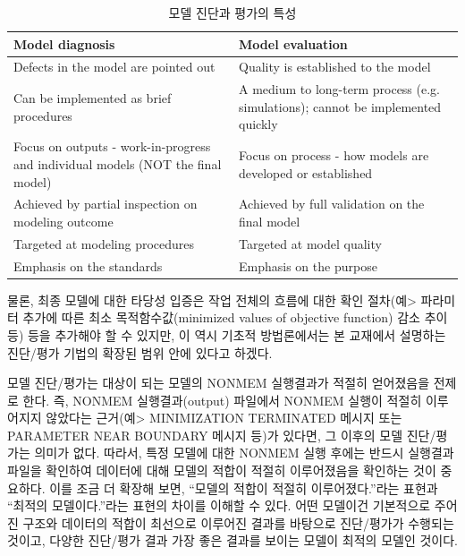 \documentclass[
  11pt,
  krantz2, a4paper, twoside]{krantz}
\theoremstyle{definition}
\theoremstyle{definition}
\theoremstyle{definition}
\theoremstyle{remark}
\begin{document}
\begin{table}

\caption{\label{tab:diag-eval-property}모델 진단과 평가의 특성}
\centering
\begin{tabular}[t]{>{\raggedright\arraybackslash}p{6cm}>{\raggedright\arraybackslash}p{6cm}}
\toprule
Model diagnosis & Model evaluation\\
\midrule
Defects in the model are pointed out & Quality is established to the model\\
Can be implemented as brief procedures & A medium to long-term process (e.g. simulations); cannot be implemented quickly\\
Focus on outputs - work-in-progress and individual models (NOT the final model) & Focus on process - how models are developed or established\\
Achieved by partial inspection on modeling outcome & Achieved by full validation on the final model\\
Targeted at modeling procedures & Targeted at model quality\\
\addlinespace
Emphasis on the standards & Emphasis on the purpose\\
\bottomrule
\end{tabular}
\end{table}



물론, 최종 모델에 대한 타당성 입증은 작업 전체의 흐름에 대한 확인 절차(예\textgreater{} 파라미터 추가에 따른 최소 목적함수값(minimized values of objective function) 감소 추이 등) 등을 추가해야 할 수 있지만, 이 역시 기초적 방법론에서는 본 교재에서 설명하는 진단/평가 기법의 확장된 범위 안에 있다고 하겠다.

모델 진단/평가는 대상이 되는 모델의 NONMEM 실행결과가 적절히 얻어졌음을 전제로 한다. 즉, NONMEM 실행결과(output) 파일에서 NONMEM 실행이 적절히 이루어지지 않았다는 근거(예\textgreater{} MINIMIZATION TERMINATED 메시지 또는 PARAMETER NEAR BOUNDARY 메시지 등)가 있다면, 그 이후의 모델 진단/평가는 의미가 없다. 따라서, 특정 모델에 대한 NONMEM 실행 후에는 반드시 실행결과 파일을 확인하여 데이터에 대해 모델의 적합이 적절히 이루어졌음을 확인하는 것이 중요하다. 이를 조금 더 확장해 보면, ``모델의 적합이 적절히 이루어졌다.''라는 표현과 ``최적의 모델이다.''라는 표현의 차이를 이해할 수 있다. 어떤 모델이건 기본적으로 주어진 구조와 데이터의 적합이 최선으로 이루어진 결과를 바탕으로 진단/평가가 수행되는 것이고, 다양한 진단/평가 결과 가장 좋은 결과를 보이는 모델이 최적의 모델인 것이다.
\end{document}
